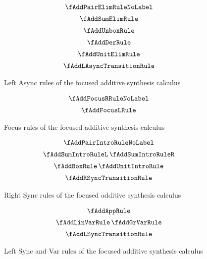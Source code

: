 \begin{figure}[H]
  \begin{align*}
\begin{array}{c}
  \fAddPairElimRuleNoLabel
  \\[0.5em]
  \fAddSumElimRule
  \\[0.5em]
  \fAddUnboxRule
  \\[0.5em]
  \fAddDerRule
  \\[0.5em]
  \fAddUnitElimRule
  \\[0.5em]
  \fAddLAsyncTransitionRule
  \end{array}
  \end{align*}
  \caption{Left Async rules of the focused additive synthesis calculus}
  \label{fig:focus-add-left-async}
\end{figure}

\begin{figure}[H]
  \begin{align*}
\begin{array}{c}
  \fAddFocusRRuleNoLabel
  \\[0.5em]
  \fAddFocusLRule
  \end{array}
  \end{align*}
  \caption{Focus rules of the focused additive synthesis calculus}
  \label{fig:focus-add-focus}
\end{figure}

\begin{figure}[H]
  \begin{align*}
\begin{array}{c}
  \fAddPairIntroRuleNoLabel
  \\[0.5em]
  \fAddSumIntroRuleL
  \,
  \fAddSumIntroRuleR
  \\[0.5em]
  \fAddBoxRule
  \,
  \fAddUnitIntroRule
  \\[0.5em]
  \fAddRSyncTransitionRule
  \end{array}
  \end{align*}
  \caption{Right Sync rules of the focused additive synthesis calculus}
  \label{fig:focus-add-right-sync}
\end{figure}

\begin{figure}[H]
  \begin{align*}
\begin{array}{c}
  \fAddAppRule
  \\[0.5em]
  \fAddLinVarRule
  \,
  \fAddGrVarRule
  \\[0.5em]
  \fAddLSyncTransitionRule
  \end{array}
  \end{align*}
  \caption{Left Sync and Var rules of the focused additive synthesis calculus}
  \label{fig:focus-add-left-sync}
\end{figure}

